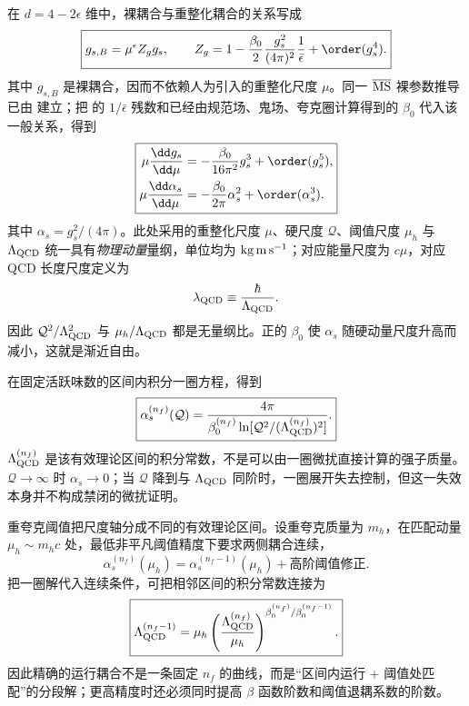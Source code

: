 在 $d=4-2\epsilon$ 维中，裸耦合与重整化耦合的关系写成
\begin{equation}
 \boxed{
 g_{s,B}=\mu^\epsilon Z_g g_s,
 \qquad
 Z_g=1-\frac{\beta_0}{2}
 \frac{g_s^2}{(4\pi)^2}\frac{1}{\bar\epsilon}
 +\order(g_s^4).}
 \label{eq:qcd-bare-coupling-msbar-dp68}
\end{equation}
其中 $g_{s,B}$ 是裸耦合，因而不依赖人为引入的重整化尺度 $\mu$。同一 $\overline{\rm MS}$ 裸参数推导已由 建立；把 的 $1/\bar\epsilon$ 残数和已经由规范场、鬼场、夸克圈计算得到的 $\beta_0$ 代入该一般关系，得到
\begin{equation}
 \boxed{\begin{aligned}
 \mu\frac{\dd g_s}{\dd\mu}
 &=-\frac{\beta_0}{16\pi^2}g_s^3+\order(g_s^5),\\
 \mu\frac{\dd\alpha_s}{\dd\mu}
 &=-\frac{\beta_0}{2\pi}\alpha_s^2+\order(\alpha_s^3).
 \end{aligned}}
 \label{eq:qcd-beta-alpha-one-loop-dp10}
\end{equation}
其中 $\alpha_s=g_s^2/(4\pi)$。此处采用的重整化尺度 $\mu$、硬尺度 $\mathcal Q$、阈值尺度 $\mu_h$ 与 $\Lambda_{\rm QCD}$ 统一具有\emph{物理动量}量纲，单位均为 ${\rm kg\,m\,s^{-1}}$；对应能量尺度为 $c\mu$，对应 QCD 长度尺度定义为
\begin{equation*}
 \lambda_{\rm QCD}\equiv\frac{\hbar}{\Lambda_{\rm QCD}}.
\end{equation*}
因此 $\mathcal Q^2/\Lambda_{\rm QCD}^2$ 与 $\mu_h/\Lambda_{\rm QCD}$ 都是无量纲比。正的 $\beta_0$ 使 $\alpha_s$ 随硬动量尺度升高而减小，这就是渐近自由。

在固定活跃味数的区间内积分一圈方程，得到
\begin{equation}
 \boxed{
 \alpha_s^{(n_f)}(\mathcal Q)
 =\frac{4\pi}
 {\beta_0^{(n_f)}\ln[\mathcal Q^2/(\Lambda_{\rm QCD}^{(n_f)})^2]}.}
 \label{eq:qcd-alpha-lambda-one-loop-dp10}
\end{equation}
$\Lambda_{\rm QCD}^{(n_f)}$ 是该有效理论区间的积分常数，不是可以由一圈微扰直接计算的强子质量。$\mathcal Q\to\infty$ 时 $\alpha_s\to0$；当 $\mathcal Q$ 降到与 $\Lambda_{\rm QCD}$ 同阶时，一圈展开失去控制，但这一失效本身并不构成禁闭的微扰证明。

重夸克阈值把尺度轴分成不同的有效理论区间。设重夸克质量为 $m_h$，在匹配动量 $\mu_h\sim m_hc$ 处，最低非平凡阈值精度下要求两侧耦合连续，
\begin{equation}
 \boxed{
 \alpha_s^{(n_f)}(\mu_h)
 =\alpha_s^{(n_f-1)}(\mu_h)
 +\text{高阶阈值修正}.}
 \label{eq:qcd-threshold-matching-alpha-dp32}
\end{equation}
把一圈解代入连续条件，可把相邻区间的积分常数连接为
\begin{equation}
 \boxed{
 \Lambda_{\rm QCD}^{(n_f-1)}
 =\mu_h
 \left(
 \frac{\Lambda_{\rm QCD}^{(n_f)}}{\mu_h}
 \right)^{\beta_0^{(n_f)}/\beta_0^{(n_f-1)}}.}
 \label{eq:qcd-threshold-lambda-dp32}
\end{equation}
因此精确的运行耦合不是一条固定 $n_f$ 的曲线，而是“区间内运行 + 阈值处匹配”的分段解；更高精度时还必须同时提高 $\beta$ 函数阶数和阈值退耦系数的阶数。


